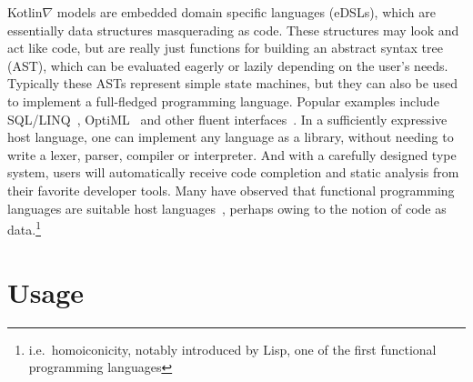 \documentclass[12pt,initial,twoside,maitrise]{dms}
\numberwithin{equation}{section}
\numberwithin{table}{chapter}
\numberwithin{figure}{chapter}
\begin{document}
Kotlin$\nabla$ models are embedded domain specific languages (eDSLs), which are essentially data structures masquerading as code. These structures may look and act like code, but are really just functions for building an abstract syntax tree (AST), which can be evaluated eagerly or lazily depending on the user's needs. Typically these ASTs represent simple state machines, but they can also be used to implement a full-fledged programming language. Popular examples include SQL/LINQ~\citep{meijer2006linq}, OptiML~\citep{sujeeth2011optiml} and other fluent interfaces~\citep{fowler05fluent}. In a sufficiently expressive host language, one can implement any language as a library, without needing to write a lexer, parser, compiler or interpreter. And with a carefully designed type system, users will automatically receive code completion and static analysis from their favorite developer tools. Many have observed that functional programming languages are suitable host languages~\citep{elliott2003compiling,rompf2010lightweight}, perhaps owing to the notion of code as data.\footnote{i.e.\ homoiconicity, notably introduced by Lisp, one of the first functional programming languages}

\section{Usage}
\end{document}
